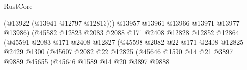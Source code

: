 \begin{lexlean}{RustCore}
\begin{coremodule}
                                                (@13922 (@13941 @12797 @12813)))
                                              @13957
                                              @13961
                                              @13966
                                              @13971
                                              @13977
                                              @13986)
                                            (@45582
                                              @12823
                                              @2083
                                              @2088
                                              @171
                                              @2408
                                              @12828
                                              @12852
                                              @12864
                                              (@45591
                                                @2083
                                                @171
                                                @2408
                                                @12827
                                                (@45598
                                                  @2082
                                                  @22
                                                  @171
                                                  @2408
                                                  @12825
                                                  @2429
                                                  @1300
                                                  (@45607
                                                    @2082
                                                    @22
                                                    @12825
                                                    (@45646
                                                      @1590
                                                      @14
                                                      @21
                                                      @3897
                                                      @9889
                                                      @45655
                                                      (@45646
                                                        @1589
                                                        @14
                                                        @20
                                                        @3897
                                                        @9888

\end{coremodule}
\end{lexlean}
